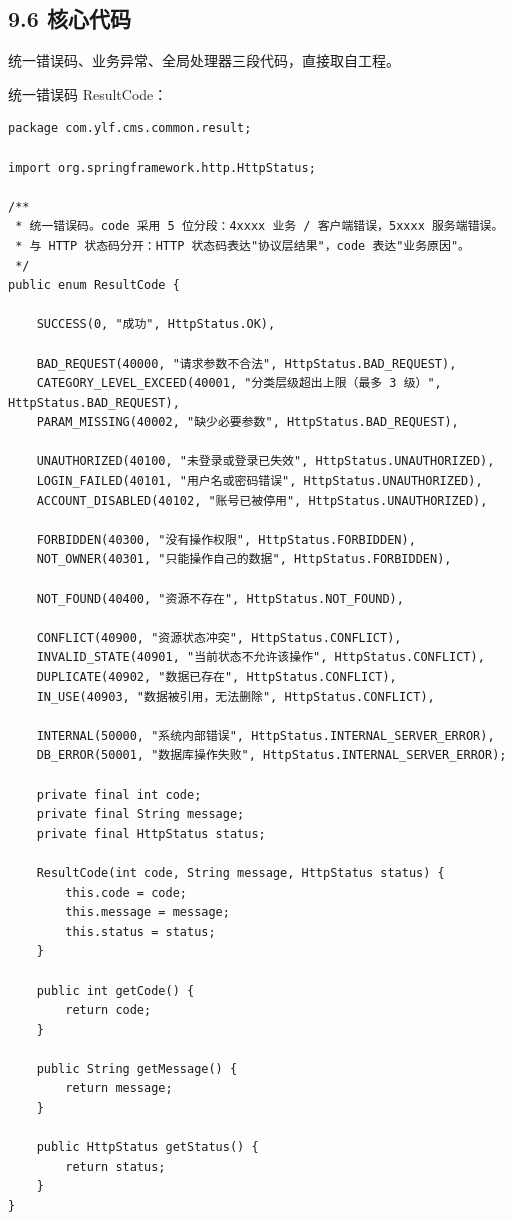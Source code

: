 \documentclass[zihao=-4,UTF8,openany]{ctexart}
\renewcommand{\_}{\textunderscore\allowbreak}
\begin{document}
\subsection*{\texorpdfstring{\textbf{9.6 核心代码}}{9.6 核心代码}}\label{sec:exc-code}

统一错误码、业务异常、全局处理器三段代码，直接取自工程。

统一错误码 ResultCode：

\begin{lstlisting}
package com.ylf.cms.common.result;

import org.springframework.http.HttpStatus;

/**
 * 统一错误码。code 采用 5 位分段：4xxxx 业务 / 客户端错误，5xxxx 服务端错误。
 * 与 HTTP 状态码分开：HTTP 状态码表达"协议层结果"，code 表达"业务原因"。
 */
public enum ResultCode {

    SUCCESS(0, "成功", HttpStatus.OK),

    BAD_REQUEST(40000, "请求参数不合法", HttpStatus.BAD_REQUEST),
    CATEGORY_LEVEL_EXCEED(40001, "分类层级超出上限（最多 3 级）", HttpStatus.BAD_REQUEST),
    PARAM_MISSING(40002, "缺少必要参数", HttpStatus.BAD_REQUEST),

    UNAUTHORIZED(40100, "未登录或登录已失效", HttpStatus.UNAUTHORIZED),
    LOGIN_FAILED(40101, "用户名或密码错误", HttpStatus.UNAUTHORIZED),
    ACCOUNT_DISABLED(40102, "账号已被停用", HttpStatus.UNAUTHORIZED),

    FORBIDDEN(40300, "没有操作权限", HttpStatus.FORBIDDEN),
    NOT_OWNER(40301, "只能操作自己的数据", HttpStatus.FORBIDDEN),

    NOT_FOUND(40400, "资源不存在", HttpStatus.NOT_FOUND),

    CONFLICT(40900, "资源状态冲突", HttpStatus.CONFLICT),
    INVALID_STATE(40901, "当前状态不允许该操作", HttpStatus.CONFLICT),
    DUPLICATE(40902, "数据已存在", HttpStatus.CONFLICT),
    IN_USE(40903, "数据被引用，无法删除", HttpStatus.CONFLICT),

    INTERNAL(50000, "系统内部错误", HttpStatus.INTERNAL_SERVER_ERROR),
    DB_ERROR(50001, "数据库操作失败", HttpStatus.INTERNAL_SERVER_ERROR);

    private final int code;
    private final String message;
    private final HttpStatus status;

    ResultCode(int code, String message, HttpStatus status) {
        this.code = code;
        this.message = message;
        this.status = status;
    }

    public int getCode() {
        return code;
    }

    public String getMessage() {
        return message;
    }

    public HttpStatus getStatus() {
        return status;
    }
}
\end{lstlisting}
\end{document}
